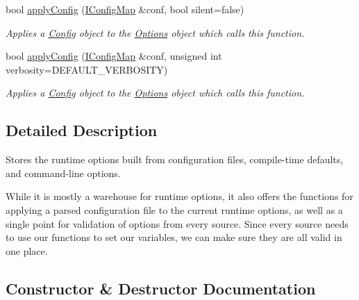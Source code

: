 \begin{DoxyCompactItemize}
bool \mbox{\hyperlink{classOptions_aefe43c4696f98d4933fd227c76bb6e28}{apply\+Config}} (\mbox{\hyperlink{classIConfigMap}{I\+Config\+Map}} \&conf, bool silent=false)
\begin{DoxyCompactList}\small\item\em Applies a \mbox{\hyperlink{classConfig}{Config}} object to the \mbox{\hyperlink{classOptions}{Options}} object which calls this function. \end{DoxyCompactList}\item 
bool \mbox{\hyperlink{classOptions_a4f55ba62327aba951afda6eed9207c71}{apply\+Config}} (\mbox{\hyperlink{classIConfigMap}{I\+Config\+Map}} \&conf, unsigned int verbosity=D\+E\+F\+A\+U\+L\+T\+\_\+\+V\+E\+R\+B\+O\+S\+I\+TY)
\begin{DoxyCompactList}\small\item\em Applies a \mbox{\hyperlink{classConfig}{Config}} object to the \mbox{\hyperlink{classOptions}{Options}} object which calls this function. \end{DoxyCompactList}\end{DoxyCompactItemize}


\subsection{Detailed Description}
Stores the runtime options built from configuration files, compile-\/time defaults, and command-\/line options. 

While it is mostly a warehouse for runtime options, it also offers the functions for applying a parsed configuration file to the current runtime options, as well as a single point for validation of options from every source. Since every source needs to use our functions to set our variables, we can make sure they are all valid in one place. 

\subsection{Constructor \& Destructor Documentation}
\mbox{\label{classOptions_a24cba1d09080384c9939db6682ea57ec}} 

